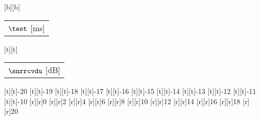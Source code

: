 %    
%
%
%
[b][b]{\fontsize{8}{12}\selectfont \color[rgb]{0,0,0}\setlength{\tabcolsep}{0pt}\begin{tabular}{c}$\test$ [ms]\end{tabular}}%
[t][t]{\fontsize{8}{12}\selectfont \color[rgb]{0,0,0}\setlength{\tabcolsep}{0pt}\begin{tabular}{c}$\snrrcvdu$ [dB]\end{tabular}}%
%
\fontsize{8}{12}%
\selectfont%
%
[t][t]{-20}%
[t][t]{-19}%
[t][t]{-18}%
[t][t]{-17}%
[t][t]{-16}%
[t][t]{-15}%
[t][t]{-14}%
[t][t]{-13}%
[t][t]{-12}%
[t][t]{-11}%
[t][t]{-10}%
%
[r][r]{0}%
[r][r]{2}%
[r][r]{4}%
[r][r]{6}%
[r][r]{8}%
[r][r]{10}%
[r][r]{12}%
[r][r]{14}%
[r][r]{16}%
[r][r]{18}%
[r][r]{20}%
%
%
